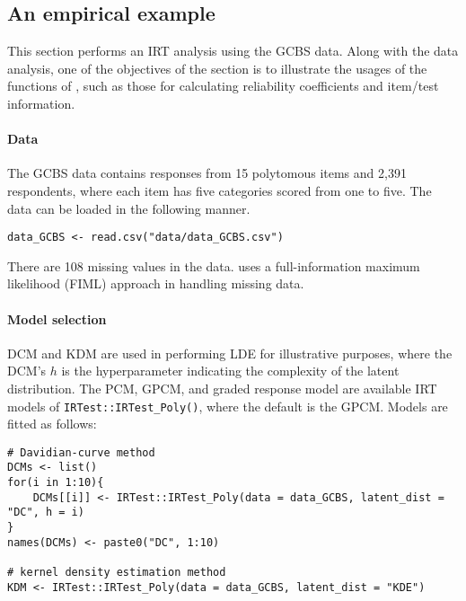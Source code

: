 \hypertarget{an-empirical-example}{%
\subsection{An empirical example}\label{an-empirical-example}}

This section performs an IRT analysis using the GCBS data. Along with the
data analysis, one of the objectives of the section is to illustrate
the usages of the functions of , such as those for
calculating reliability coefficients and item/test information.

\hypertarget{data}{%
\paragraph{Data}\label{data}}

The GCBS data contains responses from 15 polytomous items and 2,391
respondents, where each item has five categories scored from one to
five. The data can be loaded in the following manner.

\begin{verbatim}
data_GCBS <- read.csv("data/data_GCBS.csv")
\end{verbatim}

There are 108 missing values in the data.
 uses a full-information maximum likelihood (FIML) approach
in handling missing data.

\hypertarget{model-selection}{%
\paragraph{Model selection}\label{model-selection}}

DCM and KDM are used in performing LDE for illustrative purposes,
where the DCM's \(h\) is the hyperparameter indicating the complexity of the latent distribution.
The PCM, GPCM, and graded response model \citep[GRM:][]{Samejima:1969} are available IRT models
of \texttt{IRTest::IRTest\_Poly()}, where the default is the GPCM. Models are fitted as follows:

\begin{verbatim}
# Davidian-curve method
DCMs <- list()
for(i in 1:10){
    DCMs[[i]] <- IRTest::IRTest_Poly(data = data_GCBS, latent_dist = "DC", h = i)
}
names(DCMs) <- paste0("DC", 1:10)

# kernel density estimation method
KDM <- IRTest::IRTest_Poly(data = data_GCBS, latent_dist = "KDE")
\end{verbatim}

